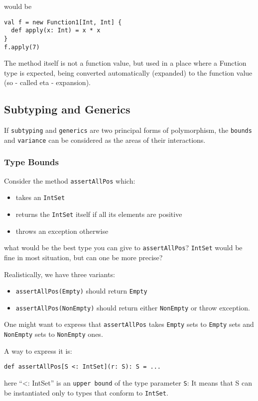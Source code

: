 \documentclass{scrartcl}
\newcommand{\term}[1]{\verb~#1~} %
\begin{document}
would be
\begin{lstlisting}
val f = new Function1[Int, Int] {
  def apply(x: Int) = x * x
}
f.apply(7)
\end{lstlisting}

The method itself is not a function value, but used in a place where a Function
type is expected, being converted automatically (expanded) to the function value
(so - called eta - expansion).

\subsection{Subtyping and Generics}
\label{sec:SubtypingAndGenerics}

If \term{subtyping} and \term{generics} are two principal forms of polymorphism,
the \term{bounds} and \term{variance} can be considered as the areas of their
interactions.

\subsubsection{Type Bounds}
\label{sec:TypeBounds}

Consider the method \lstinline|assertAllPos| which:
\begin{itemize}
\item takes an \lstinline|IntSet|
\item returns the \lstinline|IntSet| itself if all its elements are positive
\item throws an exception otherwise
\end{itemize}
what would be the best type you can give to \lstinline|assertAllPos|?
\lstinline|IntSet| would be fine in most situation, but can one be more precise?

Realistically, we have three variants:
\begin{itemize}
\item \lstinline|assertAllPos(Empty)| should return \lstinline|Empty|
\item \lstinline|assertAllPos(NonEmpty)| should return either
  \lstinline|NonEmpty| or throw exception.
\end{itemize}
One might want to express that \lstinline|assertAllPos| takes \lstinline|Empty|
sets to \lstinline|Empty| sets and \lstinline|NonEmpty| sets to
\lstinline|NonEmpty| ones.

A way to express it is:
\begin{lstlisting}
def assertAllPos[S <: IntSet](r: S): S = ...
\end{lstlisting}
here ``<: IntSet'' is an \term{upper bound} of the type parameter \lstinline|S|:
It means that S can be instantiated only to types that conform to
\lstinline|IntSet|.
\end{document}
